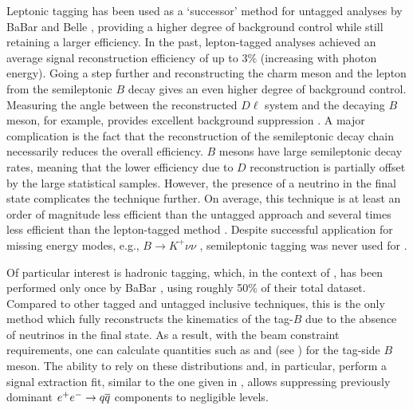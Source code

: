 Leptonic tagging has been used as a `successor' method for \BtoXsgamma untagged analyses by BaBar and Belle \cite{Belle:2009nth,BaBar:2012fqh,Belle:2016ufb}, providing a higher degree of background control while still retaining a larger efficiency.
In the past, lepton-tagged analyses achieved an average signal reconstruction efficiency of up to $3\%$ (increasing with photon energy).
Going a step further and reconstructing the charm meson and the lepton from the semileptonic $B$ decay gives an even higher degree of background control.
Measuring the angle between the reconstructed $D\ell$ system and the decaying $B$ meson, for example, provides excellent background suppression \cite{BaBar:2014omp}.
A major complication is the fact that the reconstruction of the semileptonic decay chain necessarily reduces the overall efficiency.
$B$ mesons have large semileptonic decay rates, meaning that the lower efficiency due to $D$ reconstruction is partially offset by the large statistical samples.
However, the presence of a neutrino in the final state complicates the technique further.
On average, this technique is at least an order of magnitude less efficient than the untagged approach and several times less efficient than the lepton-tagged method \cite{Belle-II:2018jsg}.
Despite successful application for missing energy modes, e.g., $B\rightarrow K^+\nu\nu$ \cite{BaBar:2009qvi}, semileptonic tagging was never used for \BtoXsgamma.

Of particular interest is hadronic tagging, which, in the context of \BtoXsgamma, has been performed only once by BaBar \cite{BaBar:2007yhb}, using roughly 50\% of their total dataset.
Compared to other tagged and untagged inclusive techniques, this is the only method which fully reconstructs the kinematics of the tag-$B$ due to the absence of neutrinos in the final state.
As a result, with the beam constraint requirements, one can calculate quantities such as \Mbc and \DeltaE (see ) for the tag-side $B$ meson.
The ability to rely on these distributions and, in particular, perform a signal extraction fit, similar to the one given in , allows suppressing previously dominant $e^+e^-\rightarrow q\overline q$ components to negligible levels.

